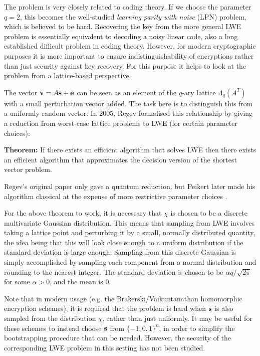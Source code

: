 \documentclass[11pt]{article}
\begin{document}
The problem is very closely related to coding theory. If we choose the parameter
$q = 2$, this becomes the well-studied \textit{learning parity with noise} (LPN)
problem, which is believed to be hard. Recovering the key from the more general
LWE problem is essentially
equivalent to decoding a noisy linear code, also a long established difficult
problem in coding theory. However, for modern cryptographic purposes it is more
important to ensure indistinguishability of encryptions rather than just
security against key recovery. For this purpose it helps to look at the
problem from a lattice-based perspective.

The vector
$\mathbf{v} = A\mathbf{s} + \mathbf{e}$ can be seen as an element of the $q$-ary lattice $\Lambda_q(A^T)$
with a small perturbation vector added. The task here is to distinguish this
from a uniformly random vector.
In 2005, Regev \cite{Regev2009} formalised this relationship by giving a reduction from
worst-case lattice problems to LWE (for certain parameter choices):

\vspace{5 mm}
\noindent\textbf{Theorem:} If there exists an efficient algorithm that solves LWE then
there exists an efficient algorithm that approximates the decision version of
the shortest vector problem.
\vspace{5 mm}

Regev's original paper only gave a quantum reduction, but Peikert
later made his algorithm classical at the expense of more restrictive parameter
choices \cite{Peikert09}.

For the above theorem to work, it is necessary that $\chi$ is chosen to be
a discrete multivariate Gaussian distribution. This means that sampling from
LWE involves taking a lattice point and perturbing it by a small, normally
distributed quantity, the idea being that this will look close enough to a
uniform distribution if the standard deviation is large enough.
Sampling from this discrete Gaussian is simply accomplished by sampling each
component from a normal distribution and rounding to the nearest integer.
The standard deviation is chosen to be $\alpha q / \sqrt{2 \pi}$ for some
$\alpha > 0$, and the mean is $0$.

Note that in modern usage (e.g. the Brakerski/Vaikuntanathan homomorphic
encryption schemes), it is required that the problem is hard when $\mathbf{s}$ is also
sampled from the distribution $\chi$, rather than just uniformly. It may be useful
for these schemes to instead choose $\mathbf{s}$ from $\{-1,0,1\}^n$, in order to
simplify the bootstrapping procedure that can be needed. However, the security
of the corresponding LWE problem in this setting has not been studied.
\end{document}
